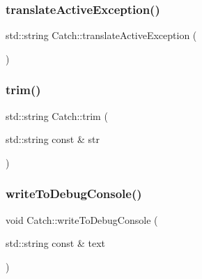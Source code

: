 \mbox{\label{namespace_catch_adafff91485eeeeb9e9333f317cc0e3b1}} 
\subsubsection{translate\+Active\+Exception()}
{\footnotesize\ttfamily std\+::string Catch\+::translate\+Active\+Exception (\begin{DoxyParamCaption}{ }\end{DoxyParamCaption})}

\mbox{\label{namespace_catch_a084108b47f37d8bfd5db51c50c7451b3}} 
\subsubsection{trim()}
{\footnotesize\ttfamily std\+::string Catch\+::trim (\begin{DoxyParamCaption}\item[{std\+::string const \&}]{str }\end{DoxyParamCaption})}

\mbox{\label{namespace_catch_aa5dcf4750ce9a854f4b74d3c952d13cc}} 
\subsubsection{write\+To\+Debug\+Console()}
{\footnotesize\ttfamily void Catch\+::write\+To\+Debug\+Console (\begin{DoxyParamCaption}\item[{std\+::string const \&}]{text }\end{DoxyParamCaption})}

